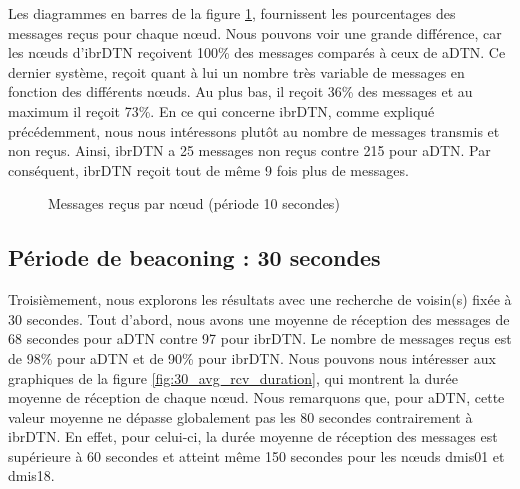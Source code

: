 \documentclass[a4paper,10pt]{article}
\begin{document}
Les diagrammes en barres de la figure \ref{fig:10_msg_rcv}, fournissent les pourcentages des messages reçus pour chaque nœud. Nous pouvons voir une grande différence, car les nœuds d’ibrDTN reçoivent 100\% des messages comparés à ceux de aDTN. Ce dernier système, reçoit quant à lui un nombre très variable de messages en fonction des différents nœuds. Au plus bas, il reçoit 36\% des messages et au maximum il reçoit 73\%. En ce qui concerne ibrDTN, comme expliqué précédemment, nous nous intéressons plutôt au nombre de messages transmis et non reçus. Ainsi, ibrDTN a 25 messages non reçus contre 215 pour aDTN. Par conséquent, ibrDTN reçoit tout de même 9 fois plus de messages.\par

\begin{figure}[h!]
    \centering
    \caption{Messages reçus par nœud  (période 10 secondes)}
    \label{fig:10_msg_rcv}
\end{figure}


\subsection {Période de beaconing : 30 secondes}
Troisièmement, nous explorons les résultats avec une recherche de voisin(s) fixée à 30 secondes. Tout d’abord, nous avons une moyenne de réception des messages de 68 secondes pour aDTN contre 97 pour ibrDTN. Le nombre de messages reçus est de 98\% pour aDTN et de 90\% pour ibrDTN. Nous pouvons nous intéresser aux graphiques de la figure \ref{fig:30_avg_rcv_duration}, qui montrent la durée moyenne de réception de chaque nœud. Nous remarquons que, pour aDTN, cette valeur moyenne ne dépasse globalement pas les 80 secondes contrairement à ibrDTN. En effet, pour celui-ci, la durée moyenne de réception des messages est supérieure à 60 secondes et atteint même 150 secondes pour les nœuds dmis01 et dmis18.\par
\end{document}

